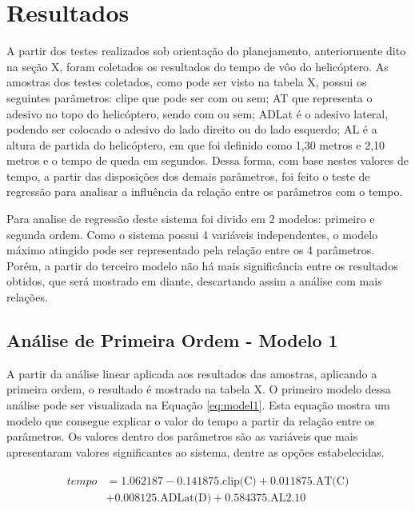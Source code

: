 \section{Resultados}
\label{sec:resultados}

A partir dos testes realizados sob orientação do planejamento, anteriormente dito na seção X, foram coletados os resultados do tempo de vôo do helicóptero. As amostras dos testes coletados, como pode ser visto na tabela X, possui os seguintes parâmetros: clipe que pode ser com ou sem; AT que representa o adesivo no topo do helicóptero, sendo com ou sem; ADLat é o adesivo lateral, podendo ser colocado o adesivo do lado direito ou do lado esquerdo; AL é a altura de partida do helicóptero, em que foi definido como 1,30 metros e 2,10 metros e o tempo de queda em segundos. Dessa forma, com base nestes valores de tempo, a partir das disposições dos demais parâmetros, foi feito o teste de regressão para analisar a influência da relação entre os parâmetros com o tempo.


Para analise de regressão deste sistema foi divido em 2 modelos: primeiro e segunda ordem. Como o sistema possui 4 variáveis independentes, o modelo máximo atingido pode ser representado pela relação entre os 4 parâmetros. Porém, a partir do terceiro modelo não há mais significância entre os resultados obtidos, que será mostrado em diante, descartando assim a análise com mais relações. 

\subsection{Análise de Primeira Ordem - Modelo 1}

A partir da análise linear aplicada aos resultados das amostras, aplicando a primeira ordem, o resultado é mostrado na tabela X. O primeiro modelo dessa análise pode ser visualizada na Equação \ref{eq:model1}. Esta equação mostra um modelo que consegue explicar o valor do tempo a partir da relação entre os parâmetros. Os valores dentro dos parâmetros são as variáveis que mais apresentaram valores significantes ao sistema, dentre as opções estabelecidas. 


\begin{align}
    \begin{split}
    tempo &= 1.062187 - 0.141875\text{.clip(C)} + 0.011875\text{.AT(C)} \\
    & + 0.008125\text{.ADLat(D)} + 0.584375\text{.AL2.10}
    \end{split}
    \label{eq:model1}
\end{align}

